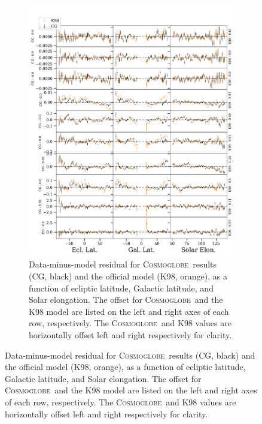 \documentclass{aa}
\def\cosmoglobe{\textsc{Cosmoglobe}}
\begin{document}
\begin{figure}
\begin{figure}
    \centering
	 \includegraphics[width=0.8\linewidth]{figs/tod_zodi_residuals.pdf}
	\caption{Data-minus-model residual for \cosmoglobe\ results (CG, black) and the official \citet{k98} model (K98, orange), as a function of ecliptic latitude, Galactic latitude, and Solar elongation. The offset for \cosmoglobe\ and the K98 model are listed on the left and right axes of each row, respectively. The \cosmoglobe\ and K98 values are horizontally offset left and right respectively for clarity.}
      \label{fig: zodi_timestream}
  \end{figure}


\end{figure}
\end{document}

